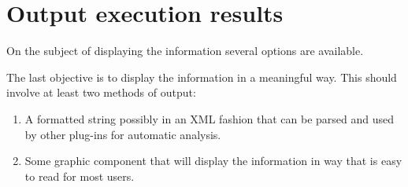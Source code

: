 \section{Output execution results}
\label{section:AutoConceptsOutput}
On the subject of displaying the information several options are available.


The last objective is to display the information in a meaningful way.
This should involve at least two methods of output:
\begin{enumerate}
  \item A formatted string possibly in an XML fashion that can be parsed and
  used by other plug-ins for automatic analysis.
  \item Some graphic component that will display the information in way that is
  easy to read for most users.
\end{enumerate}